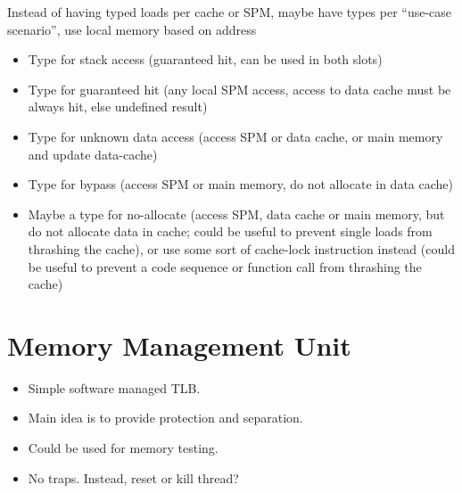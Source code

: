 \documentclass[a4paper,fontsize=10pt,twoside,DIV15,BCOR12mm,headinclude=true,footinclude=false,pagesize,bibtotoc]{scrbook}
\newcommand{\comment}[3]{

\textsf{\textbf{#1}} {\color{#3}#2}}
\newcommand{\stefan}[1]{\comment{Stefan}{#1}{RoyalPurple}}
\renewcommand{\stefan}[1]{}
\begin{document}
Instead of having typed loads per cache or SPM, maybe have types per ``use-case scenario'', use local memory based on address
\begin{itemize}
\item Type for stack access (guaranteed hit, can be used in both slots)
\item Type for guaranteed hit (any local SPM access, access to data cache must be always hit, else undefined result)
\item Type for unknown data access (access SPM or data cache, or main memory and update data-cache)
\item Type for bypass (access SPM or main memory, do not allocate in data cache)
\item Maybe a type for no-allocate (access SPM, data cache or main memory, but do not allocate data in cache; could be useful to prevent
single loads from thrashing the cache), or use some sort of cache-lock instruction instead (could be useful to prevent a code sequence or function call from
thrashing the cache)
\end{itemize}

\stefan{
The idea behind the typed load is 1.~it makes analysis simpler by having guaranteed hit instructions, 2.~it makes the hardware
simpler and faster (I assume), no need to read the address to determine the local memory to use.
However, typed loads shift the analysis effort to the compiler, but while the analysis may make over-approximations about the accessed
memory, the compiler must always know the correct memory type, which requires either a precise analysis or help from the programmer by
additional annotations. An analysis can also be context-sensitive, but it is not possible for the compiler to generate ``context-sensitive
typed loads''. A better way for 1.~could be to generate annotations for memory accesses by the compiler instead of putting the
information into the code, which then can be context-sensitive and imprecise and allows for better code reuse, although this (mostly) eliminates the advantages of 2.
Might be interesting to compare those two approaches.
}

\stefan{Note: if we use a DMA controller, we do not need separate memcpy functions depending on the source and destination memory, since the
DMA controller can determine source and target based on the addresses (hopefully).
}

\section{Memory Management Unit}
\begin{itemize}
  \item Simple software managed TLB.
  \item Main idea is to provide protection and separation.
  \item Could be used for memory testing.
  \item No traps. Instead, reset or kill thread?
\end{itemize}
\end{document}
